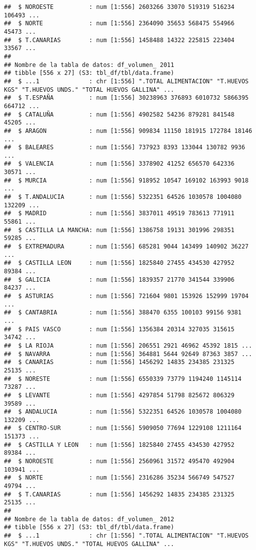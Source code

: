 \documentclass[
]{article}
\begin{document}
\begin{verbatim}
##  $ NOROESTE          : num [1:556] 2603266 33070 519319 516234 106493 ...
##  $ NORTE             : num [1:556] 2364090 35653 568475 554966 45473 ...
##  $ T.CANARIAS        : num [1:556] 1458488 14322 225815 223404 33567 ...
##  
## Nombre de la tabla de datos: df_volumen_ 2011 
## tibble [556 x 27] (S3: tbl_df/tbl/data.frame)
##  $ ...1              : chr [1:556] ".TOTAL ALIMENTACION" "T.HUEVOS KGS" "T.HUEVOS UNDS." "TOTAL HUEVOS GALLINA" ...
##  $ T.ESPAÑA          : num [1:556] 30238963 376893 6010732 5866395 664712 ...
##  $ CATALUÑA          : num [1:556] 4902582 54236 879281 841548 45205 ...
##  $ ARAGON            : num [1:556] 909834 11150 181915 172784 18146 ...
##  $ BALEARES          : num [1:556] 737923 8393 133044 130782 9936 ...
##  $ VALENCIA          : num [1:556] 3378902 41252 656570 642336 30571 ...
##  $ MURCIA            : num [1:556] 918952 10547 169102 163993 9018 ...
##  $ T.ANDALUCIA       : num [1:556] 5322351 64526 1030578 1004080 132209 ...
##  $ MADRID            : num [1:556] 3837011 49519 783613 771911 55861 ...
##  $ CASTILLA LA MANCHA: num [1:556] 1386758 19131 301996 298351 59285 ...
##  $ EXTREMADURA       : num [1:556] 685281 9044 143499 140902 36227 ...
##  $ CASTILLA LEON     : num [1:556] 1825840 27455 434530 427952 89384 ...
##  $ GALICIA           : num [1:556] 1839357 21770 341544 339906 84237 ...
##  $ ASTURIAS          : num [1:556] 721604 9801 153926 152999 19704 ...
##  $ CANTABRIA         : num [1:556] 388470 6355 100103 99156 9381 ...
##  $ PAIS VASCO        : num [1:556] 1356384 20314 327035 315615 34742 ...
##  $ LA RIOJA          : num [1:556] 206551 2921 46962 45392 1815 ...
##  $ NAVARRA           : num [1:556] 364881 5644 92649 87363 3857 ...
##  $ CANARIAS          : num [1:556] 1456292 14835 234385 231325 25135 ...
##  $ NORESTE           : num [1:556] 6550339 73779 1194240 1145114 73287 ...
##  $ LEVANTE           : num [1:556] 4297854 51798 825672 806329 39589 ...
##  $ ANDALUCIA         : num [1:556] 5322351 64526 1030578 1004080 132209 ...
##  $ CENTRO-SUR        : num [1:556] 5909050 77694 1229108 1211164 151373 ...
##  $ CASTILLA Y LEON   : num [1:556] 1825840 27455 434530 427952 89384 ...
##  $ NOROESTE          : num [1:556] 2560961 31572 495470 492904 103941 ...
##  $ NORTE             : num [1:556] 2316286 35234 566749 547527 49794 ...
##  $ T.CANARIAS        : num [1:556] 1456292 14835 234385 231325 25135 ...
##  
## Nombre de la tabla de datos: df_volumen_ 2012 
## tibble [556 x 27] (S3: tbl_df/tbl/data.frame)
##  $ ...1              : chr [1:556] ".TOTAL ALIMENTACION" "T.HUEVOS KGS" "T.HUEVOS UNDS." "TOTAL HUEVOS GALLINA" ...

\end{verbatim}
\end{document}
